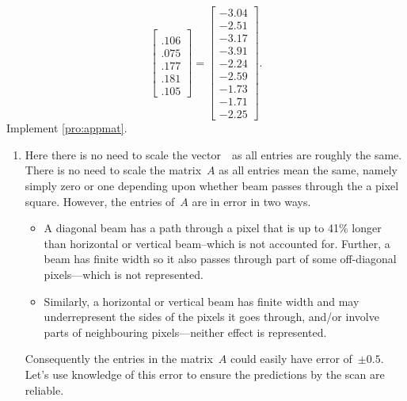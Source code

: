 \begin{example}
\begin{solution}
\begin{equation*}
\begin{bmatrix}
\\ .106
\\ .075
\\ .177
\\ .181
\\ .105 \end{bmatrix}
=\begin{bmatrix} -3.04
\\ -2.51
\\ -3.17
\\ -3.91
\\ -2.24
\\ -2.59
\\ -1.73
\\ -1.71
\\ -2.25 \end{bmatrix}.
\end{equation*}
\setbox\ajrqrbox\hbox{}%
\marginajrbox%
Implement \cref{pro:appmat}.
\begin{enumerate}
\item Here there is no need to scale the vector~\bv\ as all entries are roughly the same.
There is no need to scale the matrix~\(A\) as all entries mean the same, namely simply zero or one depending upon whether  beam passes through the a pixel square.
However, the entries of~\(A\) are in error in two ways.
\begin{itemize}
\item A diagonal beam has a path through a pixel that is up to 41\% longer than horizontal or vertical beam--which is not accounted for.  Further, a beam has finite width so it also passes through part of some off-diagonal pixels---which is not represented.
\item Similarly, a horizontal or vertical beam has finite width and may underrepresent the sides of the pixels it goes through, and/or involve parts of neighbouring pixels---neither effect is represented.
\end{itemize}
Consequently the entries in the matrix~\(A\) could easily have error of~\(\pm0.5\).
Let's use knowledge of this error to ensure the predictions by the scan are reliable.


\end{enumerate}
\end{solution}
\end{example}
